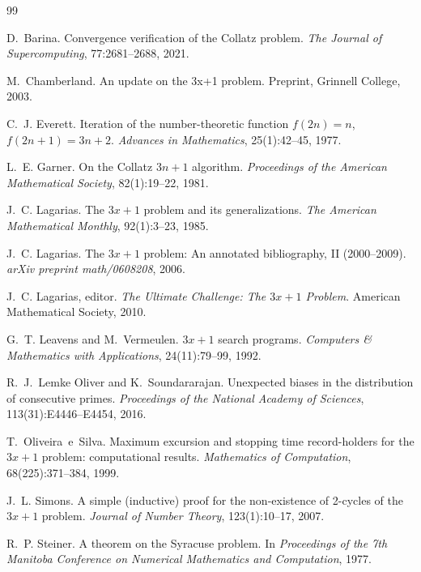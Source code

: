 \documentclass[11pt,a4paper]{article}
\theoremstyle{plain}
\theoremstyle{definition}
\begin{document}
\begin{thebibliography}{99}

D.~Barina.
\newblock Convergence verification of the {C}ollatz problem.
\newblock \emph{The Journal of Supercomputing}, 77:2681--2688, 2021.

M.~Chamberland.
\newblock An update on the 3x+1 problem.
\newblock Preprint, Grinnell College, 2003.

C.~J. Everett.
\newblock Iteration of the number-theoretic function $f(2n)=n$, $f(2n+1)=3n+2$.
\newblock \emph{Advances in Mathematics}, 25(1):42--45, 1977.

L.~E. Garner.
\newblock On the {C}ollatz $3n+1$ algorithm.
\newblock \emph{Proceedings of the American Mathematical Society}, 82(1):19--22, 1981.

J.~C. Lagarias.
\newblock The $3x+1$ problem and its generalizations.
\newblock \emph{The American Mathematical Monthly}, 92(1):3--23, 1985.

J.~C. Lagarias.
\newblock The $3x+1$ problem: An annotated bibliography, {II} (2000--2009).
\newblock \emph{arXiv preprint math/0608208}, 2006.

J.~C. Lagarias, editor.
\newblock \emph{The Ultimate Challenge: The $3x+1$ Problem}.
\newblock American Mathematical Society, 2010.

G.~T. Leavens and M.~Vermeulen.
\newblock $3x+1$ search programs.
\newblock \emph{Computers \& Mathematics with Applications}, 24(11):79--99, 1992.

R.~J.~Lemke Oliver and K.~Soundararajan.
\newblock Unexpected biases in the distribution of consecutive primes.
\newblock \emph{Proceedings of the National Academy of Sciences}, 113(31):E4446--E4454, 2016.

T.~Oliveira~e~Silva.
\newblock Maximum excursion and stopping time record-holders for the $3x+1$ problem: computational results.
\newblock \emph{Mathematics of Computation}, 68(225):371--384, 1999.

J.~L. Simons.
\newblock A simple (inductive) proof for the non-existence of 2-cycles of the $3x+1$ problem.
\newblock \emph{Journal of Number Theory}, 123(1):10--17, 2007.

R.~P. Steiner.
\newblock A theorem on the {S}yracuse problem.
\newblock In \emph{Proceedings of the 7th Manitoba Conference on Numerical Mathematics and Computation}, 1977.


\end{thebibliography}
\end{document}
